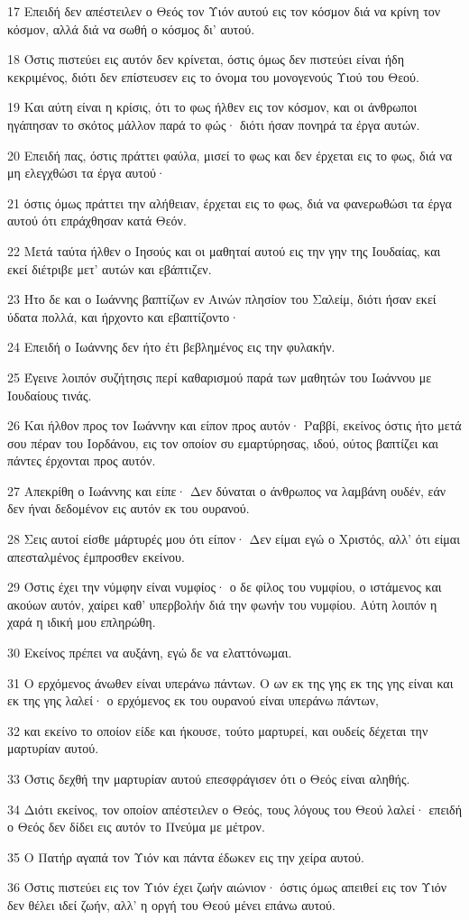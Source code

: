 \par 17 Επειδή δεν απέστειλεν ο Θεός τον Υιόν αυτού εις τον κόσμον διά να κρίνη τον κόσμον, αλλά διά να σωθή ο κόσμος δι' αυτού.
\par 18 Όστις πιστεύει εις αυτόν δεν κρίνεται, όστις όμως δεν πιστεύει είναι ήδη κεκριμένος, διότι δεν επίστευσεν εις το όνομα του μονογενούς Υιού του Θεού.
\par 19 Και αύτη είναι η κρίσις, ότι το φως ήλθεν εις τον κόσμον, και οι άνθρωποι ηγάπησαν το σκότος μάλλον παρά το φώς· διότι ήσαν πονηρά τα έργα αυτών.
\par 20 Επειδή πας, όστις πράττει φαύλα, μισεί το φως και δεν έρχεται εις το φως, διά να μη ελεγχθώσι τα έργα αυτού·
\par 21 όστις όμως πράττει την αλήθειαν, έρχεται εις το φως, διά να φανερωθώσι τα έργα αυτού ότι επράχθησαν κατά Θεόν.
\par 22 Μετά ταύτα ήλθεν ο Ιησούς και οι μαθηταί αυτού εις την γην της Ιουδαίας, και εκεί διέτριβε μετ' αυτών και εβάπτιζεν.
\par 23 Ήτο δε και ο Ιωάννης βαπτίζων εν Αινών πλησίον του Σαλείμ, διότι ήσαν εκεί ύδατα πολλά, και ήρχοντο και εβαπτίζοντο·
\par 24 Επειδή ο Ιωάννης δεν ήτο έτι βεβλημένος εις την φυλακήν.
\par 25 Έγεινε λοιπόν συζήτησις περί καθαρισμού παρά των μαθητών του Ιωάννου με Ιουδαίους τινάς.
\par 26 Και ήλθον προς τον Ιωάννην και είπον προς αυτόν· Ραββί, εκείνος όστις ήτο μετά σου πέραν του Ιορδάνου, εις τον οποίον συ εμαρτύρησας, ιδού, ούτος βαπτίζει και πάντες έρχονται προς αυτόν.
\par 27 Απεκρίθη ο Ιωάννης και είπε· Δεν δύναται ο άνθρωπος να λαμβάνη ουδέν, εάν δεν ήναι δεδομένον εις αυτόν εκ του ουρανού.
\par 28 Σεις αυτοί είσθε μάρτυρές μου ότι είπον· Δεν είμαι εγώ ο Χριστός, αλλ' ότι είμαι απεσταλμένος έμπροσθεν εκείνου.
\par 29 Όστις έχει την νύμφην είναι νυμφίος· ο δε φίλος του νυμφίου, ο ιστάμενος και ακούων αυτόν, χαίρει καθ' υπερβολήν διά την φωνήν του νυμφίου. Αύτη λοιπόν η χαρά η ιδική μου επληρώθη.
\par 30 Εκείνος πρέπει να αυξάνη, εγώ δε να ελαττόνωμαι.
\par 31 Ο ερχόμενος άνωθεν είναι υπεράνω πάντων. Ο ων εκ της γης εκ της γης είναι και εκ της γης λαλεί· ο ερχόμενος εκ του ουρανού είναι υπεράνω πάντων,
\par 32 και εκείνο το οποίον είδε και ήκουσε, τούτο μαρτυρεί, και ουδείς δέχεται την μαρτυρίαν αυτού.
\par 33 Όστις δεχθή την μαρτυρίαν αυτού επεσφράγισεν ότι ο Θεός είναι αληθής.
\par 34 Διότι εκείνος, τον οποίον απέστειλεν ο Θεός, τους λόγους του Θεού λαλεί· επειδή ο Θεός δεν δίδει εις αυτόν το Πνεύμα με μέτρον.
\par 35 Ο Πατήρ αγαπά τον Υιόν και πάντα έδωκεν εις την χείρα αυτού.
\par 36 Όστις πιστεύει εις τον Υιόν έχει ζωήν αιώνιον· όστις όμως απειθεί εις τον Υιόν δεν θέλει ιδεί ζωήν, αλλ' η οργή του Θεού μένει επάνω αυτού.

